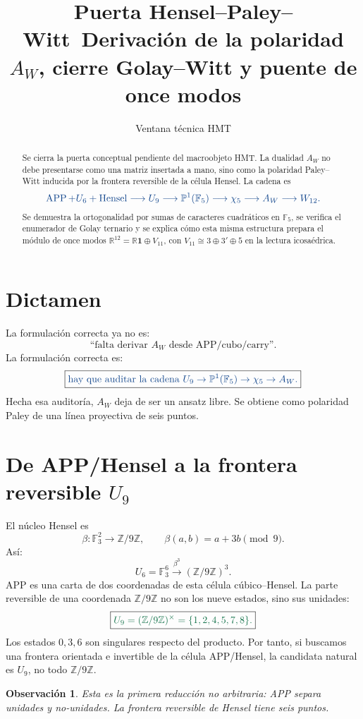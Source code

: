 \documentclass[11pt,a4paper]{article}
\title{\bfseries \textcolor{HMTblue}{Puerta Hensel--Paley--Witt}\
\large Derivación de la polaridad \(A_W\), cierre Golay--Witt y puente de once modos}
\author{Ventana técnica HMT}
\date{}
\newcommand{\blue}[1]{\textcolor{HMTblue}{#1}}
\newcommand{\green}[1]{\textcolor{HMTgreen}{#1}}
\newcommand{\F}{\mathbb F}
\newcommand{\Z}{\mathbb Z}
\newcommand{\Pone}{\mathbb P^1}
\newcommand{\APP}{\operatorname{APP}}
\newcommand{\one}{\mathbf 1}
\newtheorem{observacion}{Observación}
\begin{document}
\maketitle
\begin{abstract}
Se cierra la puerta conceptual pendiente del macroobjeto HMT. La dualidad \(A_W\) no debe presentarse como una matriz insertada a mano, sino como la polaridad Paley--Witt inducida por la frontera reversible de la célula Hensel. La cadena es
\[
\blue{\APP+U_6+\text{Hensel}\longrightarrow U_9\longrightarrow \Pone(\F_5)\longrightarrow \chi_5\longrightarrow A_W\longrightarrow W_{12}.}
\]
Se demuestra la ortogonalidad por sumas de caracteres cuadráticos en \(\F_5\), se verifica el enumerador de Golay ternario y se explica cómo esta misma estructura prepara el módulo de once modos
\(\mathbb R^{12}=\mathbb R\one\oplus V_{11}\), con \(V_{11}\cong3\oplus3'\oplus5\) en la lectura icosaédrica.
\end{abstract}
\tableofcontents

\section{Dictamen}
La formulación correcta ya no es:
\[
\text{``falta derivar }A_W\text{ desde APP/cubo/carry''.}
\]
La formulación correcta es:
\[
\boxed{\blue{\text{hay que auditar la cadena }U_9\to \Pone(\F_5)\to\chi_5\to A_W.}}
\]
Hecha esa auditoría, \(A_W\) deja de ser un ansatz libre. Se obtiene como polaridad Paley de una línea proyectiva de seis puntos.

\section{De APP/Hensel a la frontera reversible \(U_9\)}
El núcleo Hensel es
\[
\beta:\F_3^2\to\Z/9\Z,
\qquad
\beta(a,b)=a+3b\pmod9.
\]
Así:
\[
U_6=\F_3^6\xrightarrow{\beta^3}(\Z/9\Z)^3.
\]
APP es una carta de dos coordenadas de esta célula cúbico--Hensel. La parte reversible de una coordenada \(\Z/9\Z\) no son los nueve estados, sino sus unidades:
\[
\boxed{\green{U_9=(\Z/9\Z)^\times=\{1,2,4,5,7,8\}.}}
\]
Los estados \(0,3,6\) son singulares respecto del producto. Por tanto, si buscamos una frontera orientada e invertible de la célula APP/Hensel, la candidata natural es \(U_9\), no todo \(\Z/9\Z\).

\begin{observacion}
Esta es la primera reducción no arbitraria: APP separa unidades y no-unidades. La frontera reversible de Hensel tiene seis puntos.
\end{observacion}
\end{document}
